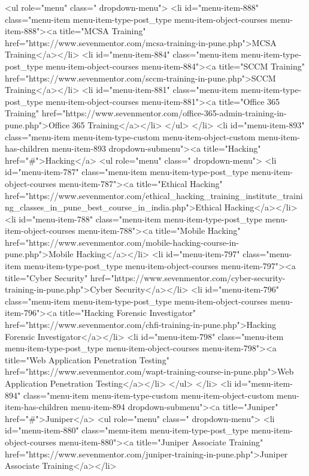 {<ul role="menu" class=" dropdown-menu">
<li id="menu-item-888" class="menu-item menu-item-type-post_type menu-item-object-courses menu-item-888"><a title="MCSA Training" href="https://www.sevenmentor.com/mcsa-training-in-pune.php">MCSA Training</a></li>
<li id="menu-item-884" class="menu-item menu-item-type-post_type menu-item-object-courses menu-item-884"><a title="SCCM Training" href="https://www.sevenmentor.com/sccm-training-in-pune.php">SCCM Training</a></li>
<li id="menu-item-881" class="menu-item menu-item-type-post_type menu-item-object-courses menu-item-881"><a title="Office 365 Training" href="https://www.sevenmentor.com/office-365-admin-training-in-pune.php">Office 365 Training</a></li>
</ul>
</li>
<li id="menu-item-893" class="menu-item menu-item-type-custom menu-item-object-custom menu-item-has-children menu-item-893 dropdown-submenu"><a title="Hacking" href="#">Hacking</a>
<ul role="menu" class=" dropdown-menu">
<li id="menu-item-787" class="menu-item menu-item-type-post_type menu-item-object-courses menu-item-787"><a title="Ethical Hacking" href="https://www.sevenmentor.com/ethical_hacking_training_institute_training_classes_in_pune_best_course_in_india.php">Ethical Hacking</a></li>
<li id="menu-item-788" class="menu-item menu-item-type-post_type menu-item-object-courses menu-item-788"><a title="Mobile Hacking" href="https://www.sevenmentor.com/mobile-hacking-course-in-pune.php">Mobile Hacking</a></li>
<li id="menu-item-797" class="menu-item menu-item-type-post_type menu-item-object-courses menu-item-797"><a title="Cyber Security" href="https://www.sevenmentor.com/cyber-security-training-in-pune.php">Cyber Security</a></li>
<li id="menu-item-796" class="menu-item menu-item-type-post_type menu-item-object-courses menu-item-796"><a title="Hacking Forensic Investigator" href="https://www.sevenmentor.com/chfi-training-in-pune.php">Hacking Forensic Investigator</a></li>
<li id="menu-item-798" class="menu-item menu-item-type-post_type menu-item-object-courses menu-item-798"><a title="Web Application Penetration Testing" href="https://www.sevenmentor.com/wapt-training-course-in-pune.php">Web Application Penetration Testing</a></li>
</ul>
</li>
<li id="menu-item-894" class="menu-item menu-item-type-custom menu-item-object-custom menu-item-has-children menu-item-894 dropdown-submenu"><a title="Juniper" href="#">Juniper</a>
<ul role="menu" class=" dropdown-menu">
<li id="menu-item-880" class="menu-item menu-item-type-post_type menu-item-object-courses menu-item-880"><a title="Juniper Associate Training" href="https://www.sevenmentor.com/juniper-training-in-pune.php">Juniper Associate Training</a></li>
}
